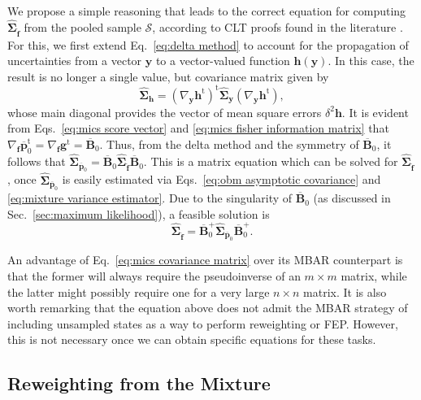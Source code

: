 \documentclass[journal=jctcce,manuscript=article]{achemso}
\newcommand{\mt}[1]{\boldsymbol{\mathbf{#1}}}   %
\newcommand{\vt}[1]{\boldsymbol{\mathbf{#1}}}   %
\newcommand{\tr}[1]{#1^\text{t}}                %
\newcommand{\avg}[1]{\overline{#1}}             %
\begin{document}
We propose a simple reasoning that leads to the correct equation for computing $ \hat{\mt \Sigma}_{\hat{\vt f}}$ from the pooled sample $\mathcal S$, according to CLT proofs found in the literature \cite{Geyer_1994, Buta_2010, Buta_2011, Doss_2014}. For this, we first extend Eq.~\eqref{eq:delta method} to account for the propagation of uncertainties from a vector $\vt y$ to a vector-valued function $\vt h({\vt y})$. In this case, the result is no longer a single value, but covariance matrix given by
\begin{equation*}
\label{eq:vectorial delta method}
\hat{\mt \Sigma}_{\vt h} = \tr{(\nabla_{\vt y} \tr{\vt h})} \hat{\mt \Sigma}_{\vt y}(\nabla_{\vt y} \tr{\vt h}),
\end{equation*}
whose main diagonal provides the vector of mean square errors $\delta^2 \vt h$. It is evident from Eqs.~\eqref{eq:mics score vector} and \eqref{eq:mics fisher information matrix} that $\nabla_{\vt f}\tr{\avg{\vt p}}_0 = \nabla_{\vt f}\tr{\vt g} = \avg{\mt B}_0$. Thus, from the delta method and the symmetry of $\avg{\mt B}_0$, it follows that $\hat{\mt \Sigma}_{\avg{\vt p}_0} = \avg{\mt B}_0 \hat{\mt \Sigma}_{\hat{\vt f}} \avg{\mt B}_0$. This is a matrix equation which can be solved for $\hat{\mt \Sigma}_{\hat{\vt f}}$, once $\hat{\mt \Sigma}_{\avg{\vt p}_0}$ is easily estimated via Eqs.~\eqref{eq:obm asymptotic covariance} and \eqref{eq:mixture variance estimator}. Due to the singularity of $\avg{\mt B}_0$ (as discussed in Sec.~\ref{sec:maximum likelihood}), a feasible solution is
\begin{equation}
\label{eq:mics covariance matrix}
\hat{\mt \Sigma}_{\hat{\vt f}} = \avg{\mt B}_0^+  \hat{\mt \Sigma}_{\avg{\vt p}_0} \avg{\mt B}_0^+.
\end{equation}

An advantage of Eq.~\eqref{eq:mics covariance matrix} over its MBAR counterpart is that the former will always require the pseudoinverse of an $m \times m$ matrix, while the latter might possibly require one for a very large $n \times n$ matrix. It is also worth remarking that the equation above does not admit the MBAR strategy of including unsampled states as a way to perform reweighting or FEP. However, this is not necessary once we can obtain specific equations for these tasks.

\subsection{Reweighting from the Mixture}
\label{sec:mics reweighting}
\end{document}

